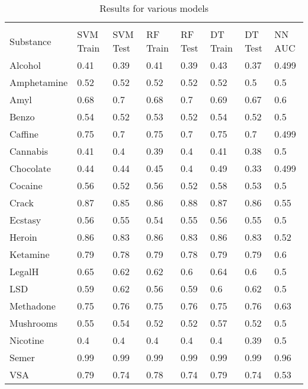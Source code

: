 \documentclass[12pt]{article}
\begin{document}
\begin{flushleft}
		\begin{table}
			\centering
			\caption{Results for various models}
			\label{my-label}
			\begin{tabular}{llllllll}
				&           &          &          &         &          &         &        \\
				Substance   & SVM Train & SVM Test & RF Train & RF Test & DT Train & DT Test & NN AUC \\
				Alcohol     & 0.41      & 0.39     & 0.41     & 0.39    & 0.43     & 0.37    & 0.499  \\
				Amphetamine & 0.52      & 0.52     & 0.52     & 0.52    & 0.52     & 0.5     & 0.5    \\
				Amyl        & 0.68      & 0.7      & 0.68     & 0.7     & 0.69     & 0.67    & 0.6    \\
				Benzo       & 0.54      & 0.52     & 0.53     & 0.52    & 0.54     & 0.52    & 0.5    \\
				Caffine     & 0.75      & 0.7      & 0.75     & 0.7     & 0.75     & 0.7     & 0.499  \\
				Cannabis    & 0.41      & 0.4      & 0.39     & 0.4     & 0.41     & 0.38    & 0.5    \\
				Chocolate   & 0.44      & 0.44     & 0.45     & 0.4     & 0.49     & 0.33    & 0.499  \\
				Cocaine     & 0.56      & 0.52     & 0.56     & 0.52    & 0.58     & 0.53    & 0.5    \\
				Crack       & 0.87      & 0.85     & 0.86     & 0.88    & 0.87     & 0.86    & 0.55   \\
				Ecstasy     & 0.56      & 0.55     & 0.54     & 0.55    & 0.56     & 0.55    & 0.5    \\
				Heroin      & 0.86      & 0.83     & 0.86     & 0.83    & 0.86     & 0.83    & 0.52   \\
				Ketamine    & 0.79      & 0.78     & 0.79     & 0.78    & 0.79     & 0.79    & 0.6    \\
				LegalH      & 0.65      & 0.62     & 0.62     & 0.6     & 0.64     & 0.6     & 0.5    \\
				LSD         & 0.59      & 0.62     & 0.56     & 0.59    & 0.6      & 0.62    & 0.5    \\
				Methadone   & 0.75      & 0.76     & 0.75     & 0.76    & 0.75     & 0.76    & 0.63   \\
				Mushrooms   & 0.55      & 0.54     & 0.52     & 0.52    & 0.57     & 0.52    & 0.5    \\
				Nicotine    & 0.4       & 0.4      & 0.4      & 0.4     & 0.4      & 0.39    & 0.5    \\
				Semer       & 0.99      & 0.99     & 0.99     & 0.99    & 0.99     & 0.99    & 0.96   \\
				VSA         & 0.79      & 0.74     & 0.78     & 0.74    & 0.79     & 0.74    & 0.53  
			\end{tabular}
		\end{table}
	

\end{flushleft}
\end{document}
